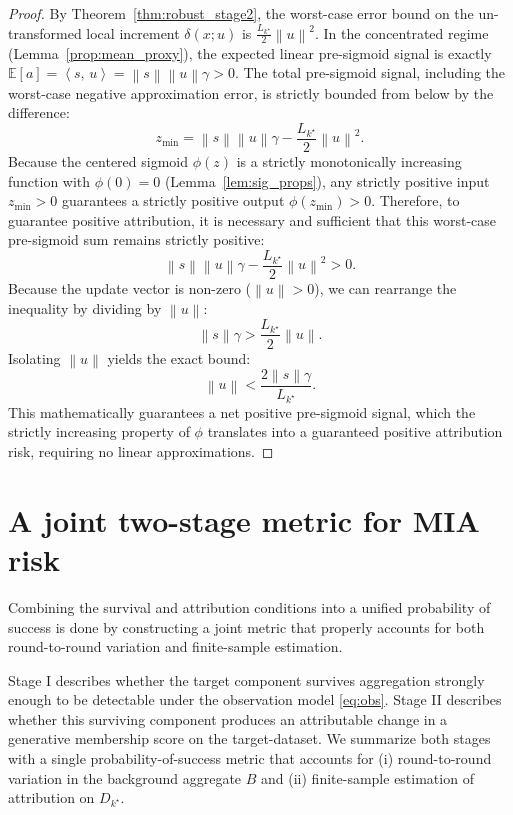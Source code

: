 \documentclass[bdcc,article,submit,pdftex]{Definitions/mdpi}
\newcommand{\ip}[2]{\left\langle #1,\,#2 \right\rangle}
\newcommand{\norm}[1]{\left\lVert #1 \right\rVert}
\newcommand{\E}{\mathbb{E}}
\newcommand{\tindex}{k^\star}
\newcommand{\utarget}{u}
\begin{document}
\begin{proof}
By Theorem~\ref{thm:robust_stage2}, the worst-case error bound on the un-transformed local increment $\delta(x; u)$ is $\frac{L_{\tindex}}{2}\norm{\utarget}^2$. 
In the concentrated regime (Lemma~\ref{prop:mean_proxy}), the expected linear pre-sigmoid signal is exactly $\E[a] = \ip{s}{\utarget} = \norm{s}\norm{\utarget}\gamma > 0$.
The total pre-sigmoid signal, including the worst-case negative approximation error, is strictly bounded from below by the difference:
\[
z_{\text{min}} = \norm{s}\norm{\utarget}\gamma - \frac{L_{\tindex}}{2}\norm{\utarget}^2.
\]
Because the centered sigmoid $\phi(z)$ is a strictly monotonically increasing function with $\phi(0) = 0$ (Lemma~\ref{lem:sig_props}), any strictly positive input $z_{\text{min}} > 0$ guarantees a strictly positive output $\phi(z_{\text{min}}) > 0$.
Therefore, to guarantee positive attribution, it is necessary and sufficient that this worst-case pre-sigmoid sum remains strictly positive:
\[
\norm{s}\norm{\utarget}\gamma - \frac{L_{\tindex}}{2}\norm{\utarget}^2 > 0.
\]
Because the update vector is non-zero ($\norm{\utarget} > 0$), we can rearrange the inequality by dividing by $\norm{\utarget}$:
\[
\norm{s}\gamma > \frac{L_{\tindex}}{2}\norm{\utarget}.
\]
Isolating $\norm{\utarget}$ yields the exact bound:
\[
\norm{\utarget} < \frac{2\norm{s}\gamma}{L_{\tindex}}.
\]
This mathematically guarantees a net positive pre-sigmoid signal, which the strictly increasing property of $\phi$ translates into a guaranteed positive attribution risk, requiring no linear approximations.
\end{proof}

\section{A joint two-stage metric for MIA risk}
\label{sec:two_stage_metric}

Combining the survival and attribution conditions into a unified probability of success is done by constructing a joint metric that properly accounts for both round-to-round variation and finite-sample estimation.

Stage I describes whether the target component survives aggregation strongly enough to be detectable under the observation model \eqref{eq:obs}.
Stage II describes whether this surviving component produces an attributable change in a generative membership score on the target-dataset.
We summarize both stages with a single probability-of-success metric that accounts for (i) round-to-round variation in the background aggregate $B$
and (ii) finite-sample estimation of attribution on $D_{\tindex}$.
\end{document}
